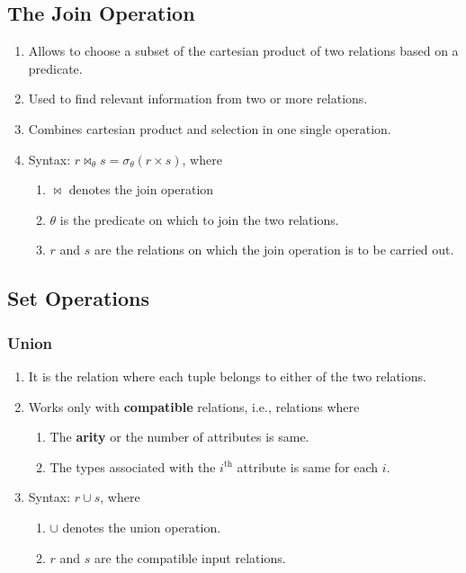 \documentclass[journal,12pt,twocolumn]{IEEEtran}
\begin{document}
\subsection{The Join Operation}
\begin{enumerate}
    \item Allows to choose a subset of the cartesian product of two relations based on a predicate.
    \item Used to find relevant information from two or more relations.
    \item Combines cartesian product and selection in one single operation.
    \item Syntax: $r \Join_\theta s = \sigma_\theta(r \times s)$, where
    \begin{enumerate}
        \item $\Join$ denotes the join operation
        \item $\theta$ is the predicate on which to join the two relations.
        \item $r$ and $s$ are the relations on which the join operation is to be carried out.
    \end{enumerate}
\end{enumerate}

\subsection{Set Operations}
\subsubsection{Union}
\begin{enumerate}
    \item It is the relation where each tuple belongs to either of the two 
    relations.
    \item Works only with \textbf{compatible} relations, i.e., relations 
    where
    \begin{enumerate}
        \item The \textbf{arity} or the number of attributes is same.
        \item The types associated with the $i^\text{th}$ attribute is same
        for each $i$.
    \end{enumerate}
    \item Syntax: $r \cup s$, where
    \begin{enumerate}
        \item $\cup$ denotes the union operation.
        \item $r$ and $s$ are the compatible input relations.
    \end{enumerate}
\end{enumerate}
\end{document}
